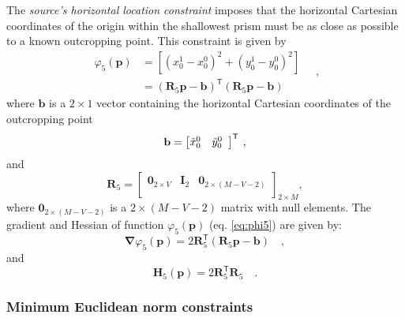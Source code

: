 The \textit{source's horizontal location constraint} imposes that the horizontal Cartesian coordinates of the origin within 
the shallowest prism must be as close as possible to a known outcropping point. This constraint is given by
\begin{equation}\label{eq:phi5}
\begin{split}
\varphi_{5}(\mathbf{p}) &= \left[\left(x_{0}^{1} - x_{0}^{0}\right)^2 + \left(y_{0}^{1} - y_0^0\right)^2\right] \\
&= \left(\mathbf{R}_{5} \mathbf{p} - \mathbf{b} \right)^{\mathsf{T}}
\left(\mathbf{R}_{5} \mathbf{p} - \mathbf{b}\right)
\end{split} \quad ,
\end{equation}
where $\mathbf{b}$ is a $2 \times 1$ vector containing the horizontal Cartesian coordinates of the outcropping point 
\begin{equation}
\mathbf{b} = \left[ \begin{array}{@{}*{12}{c}@{}}
\tilde{x}_{0}^{0} & \tilde{y}_{0}^{0} \\
\end{array} \right]^{\mathsf{T}} \: ,
\label{eq:b-vector}
\end{equation}
and
\begin{equation}
\mathbf{R}_{5} = 
\begin{bmatrix}
\mathbf{0}_{2 \times V} & \mathbf{I}_{2} & \mathbf{0}_{2 \times (M-V-2)} \\
\end{bmatrix}_{2 \times M},
\label{eq:R5-matrix}
\end{equation}
where $\mathbf{0}_{2 \times (M-V-2)}$ is a $2 \times (M-V-2)$ matrix 
with null elements. 
The gradient and Hessian of function $\varphi_{5}(\mathbf{p})$ (eq. \ref{eq:phi5}) are given by:
\begin{equation}\label{eq:phi5_grad}
\boldsymbol{\nabla}\varphi_{5}(\mathbf{p}) = 2\mathbf{R}_{5}^{\mathsf{T}}
\left(\mathbf{R}_{5} \mathbf{p} - \mathbf{b}\right) \quad ,
\end{equation}
and
\begin{equation}\label{eq:phi5_hessian}
\mathbf{H}_{5}(\mathbf{p}) = 2 \mathbf{R}^{\mathsf{T}}_{5}\mathbf{R}_{5} \quad .
\end{equation}

\subsubsection{Minimum Euclidean norm constraints}

